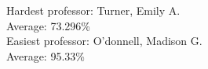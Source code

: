 Hardest professor: Turner, Emily A.\\
Average: 73.296\%\\

Easiest professor: O'donnell, Madison G.\\
Average: 95.33\%